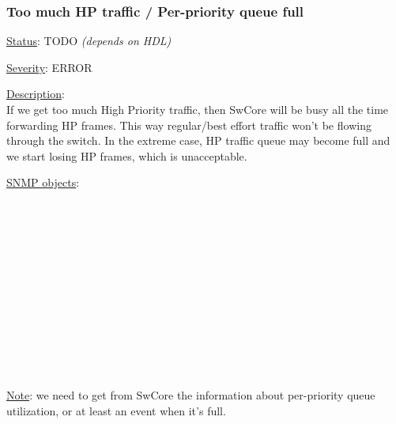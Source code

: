 \subsubsection{\bf Too much HP traffic / Per-priority queue full}
		\label{fail:data:too_much_HP}
		\begin{pck_descr}
			\item [] \underline{Status}: TODO \emph{(depends on HDL)}
			\item [] \underline{Severity}: ERROR
			\item [] \underline{Description}:\\
				If we get too much High Priority traffic, then SwCore will be busy all
				the time forwarding HP frames. This way regular/best effort traffic
				won't be flowing through the switch. In the extreme case, HP traffic
				queue may become full and we start losing HP frames, which is
				unacceptable.
			\item [] \underline{SNMP objects}:\\
        {\footnotesize
				 \\
				 \\
				 \\
				 \\
				 \\
				 \\
				 \\
				 \\
				 \\
				 \\
				\\
				\\
         }
			\item [] \underline{Note}: we need to get from SwCore the information
				about per-priority queue utilization, or at least an event when it's
				full.
		\end{pck_descr}

